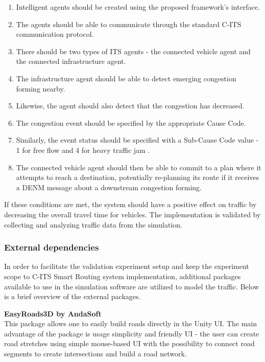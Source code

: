 \documentclass[0main.tex]{subfiles}
\begin{document}
\begin{enumerate}
    \item Intelligent agents should be created using the proposed framework's interface.
    \item The agents should be able to communicate through the standard C-ITS communication protocol.
    \item There should be two types of ITS agents - the connected vehicle agent and the connected infrastructure agent.
    \item The infrastructure agent should be able to detect emerging congestion forming nearby.
    \item Likewise, the agent should also detect that the congestion has decreased.
    \item The congestion event should be specified by the appropriate Cause Code.
    \item Similarly, the event status should be specified with a Sub-Cause Code value - 1 for
    free flow and 4 for heavy traffic jam \cite{ETSI2019}. 
    \item The connected vehicle agent should then be able to commit to a plan where it attempts to reach a
    destination, potentially re-planning its route if it receives a DENM message about a downstream congestion forming.
 \end{enumerate}

If these conditions are met, the system should have a positive effect on traffic by decreasing the overall 
travel time for vehicles. The implementation is validated by collecting and analyzing traffic data from 
the simulation.

\subsubsection{External dependencies}

In order to facilitate the validation experiment setup and keep the experiment scope to C-ITS
Smart Routing system implementation, additional packages available to use in the simulation
software are utilized to model the traffic. Below is a brief overview of the external packages.

\textbf{EasyRoads3D by AndaSoft} \smallskip \\
This package allows one to easily build roads directly in the Unity UI. The main advantage of
the package is usage simplicity and friendly UI - the user can create road stretches using
simple mouse-based UI with the possibility to connect road segments to create intersections and
build a road network.
\end{document}
